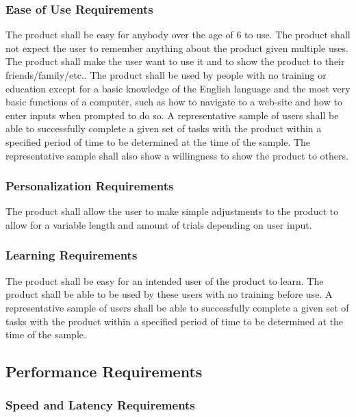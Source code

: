 \documentclass[12pt, titlepage]{article}
\begin{document}
\subsubsection{Ease of Use Requirements}

The product shall be easy for anybody over the age of 6 to use. The product 
shall not expect the user to remember anything about the product given multiple 
uses. The product shall make the user want to use it and to show the product to 
their friends/family/etc.. The product shall be used by people with no training 
or education except for a basic knowledge of the English language and the most 
very basic functions of a computer, such as how to navigate to a web-site and 
how to enter inputs when prompted to do so. A representative sample of users 
shall be able to successfully complete a given set of tasks with the product 
within a specified period of time to be determined at the time of the sample. 
The representative sample shall also show a willingness to show the product to 
others.

\subsubsection{Personalization Requirements}

The product shall allow the user to make simple adjustments to the product to 
allow for a variable length and amount of trials depending on user input. 

\subsubsection{Learning Requirements}

The product shall be easy for an intended user of the product to learn. The 
product shall be able to be used by these users with no training before use. A 
representative sample of users shall be able to successfully complete a given 
set of tasks with the product within a specified period of time to be determined 
at the time of the sample.

\subsection{Performance Requirements}

\subsubsection{Speed and Latency Requirements}
\end{document}

